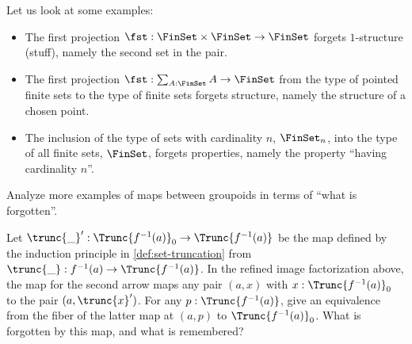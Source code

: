 \begin{example}\label{exa:stuff-struct-prop}
  Let us look at some examples:
  \begin{itemize}
  \item The first projection $\fst : \FinSet \times \FinSet \to \FinSet$
    forgets $1$-structure (stuff), namely the second set in the pair.
  \item The first projection $\fst : \sum_{A:\FinSet} A \to \FinSet$
    from the type of pointed finite sets to the type of finite sets
    forgets structure, namely the structure of a chosen point.
  \item The inclusion of the type of sets with cardinality
    $n$, $\FinSet_n$, into the type of all finite sets, $\FinSet$,
    forgets properties, namely the property
    ``having cardinality $n$''.\qedhere
    \end{itemize}
\end{example}
\begin{xca}\label{xca:stuff-struct-prop}
  Analyze more examples of maps between groupoids
  in terms of ``what is forgotten''.
\end{xca}
\begin{xca}\label{xca:0Im-to-Im}
  Let $\trunc{\_}' : \Trunc{f^{-1}(a)}_0 \to \Trunc{f^{-1}(a)}$ be the
  map defined by the induction principle in \cref{def:set-truncation}
  from $\trunc{\_} : f^{-1}(a) \to \Trunc{f^{-1}(a)}$.
  In the refined image factorization above, the map for the second arrow
  maps any pair $(a,x)$ with $x:\Trunc{f^{-1}(a)}_0$ to the pair $(a,\trunc{x}')$.
  For any $p:\Trunc{f^{-1}(a)}$, give an equivalence from the fiber
  of the latter map at $(a,p)$ to $\Trunc{f^{-1}(a)}_0$.
  What is forgotten by this map, and what is remembered?
\end{xca}


